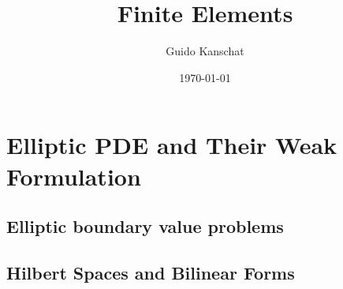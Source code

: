\documentclass[USEnglish,ignorenonframetext,notheorems,aspectratio=1610]{beamer}
\title{Finite Elements}
\author{Guido Kanschat}
\date{\today}
\begin{document}
\frame{\maketitle}
\section{Elliptic PDE and Their Weak Formulation}
\frame{\sectoc}
\subsection{Elliptic boundary value problems}

\frame {}
\frame {}
\frame {
  }
\frame {}
\frame {}
\frame {}
\frame {}
\frame {}
\frame {
  }
\frame {}
\frame {}
\frame {
  }
\frame {}
\frame {
  }
\frame {
  }
\frame {
  }

\frame {}
\frame {}
\frame {}

\subsection{Hilbert Spaces and Bilinear Forms}
\frame{\tableofcontents[currentsection,subsectionstyle=show/shaded/hide]}

\frame {}
\frame {
  }
\frame {}
\frame {}
\frame {}
\frame {}
\frame {}
\frame {}
\frame {}
\frame {}
\frame {}
\frame {}
\frame {}
\frame {}
\frame {
  }
\end{document}
